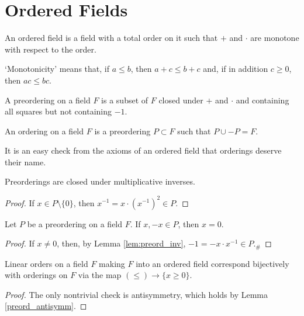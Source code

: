 \section{Ordered Fields}

\begin{definition}
  \label{def:ordered_field}
  \leanok
  An ordered field is a field with a total order on it such that $+$ and $\cdot$ are monotone with respect to the order.
\end{definition}

`Monotonicity' means that, if $a\leq b$, then $a+c\leq b+c$ and, if in addition $c\geq0$, then $ac\leq bc$.

\begin{definition}
  \label{def:preordering}
  \leanok
  A preordering on a field $F$ is a subset of $F$ closed under $+$ and $\cdot$ and containing all squares but not containing $-1$.
\end{definition}

\begin{definition}
  \label{def:ordering}
  \leanok
  An ordering on a field $F$ is a preordering $P\subset F$ such that $P\cup -P=F$.
\end{definition}

It is an easy check from the axioms of an ordered field that orderings deserve their name.

\begin{lemma}
  \label{lem:preord_inv}
  \leanok
  Preorderings are closed under multiplicative inverses.
\end{lemma}
\begin{proof}
  \leanok
  If $x\in P\setminus\{0\}$, then $x^{-1}=x\cdot(x^{-1})^2\in P$.
\end{proof}

\begin{lemma}
  \label{lem:preord_antisymm}
  \leanok
  Let $P$ be a preordering on a field $F$. If $x,-x\in P$, then $x=0$.
\end{lemma}
\begin{proof}
  \leanok
  If $x\neq0$, then, by Lemma \ref{lem:preord_inv}, $-1=-x\cdot x^{-1}\in P$.$_\#$
\end{proof}

\begin{lemma}
  \label{lem:linord_fieldord_bij}
  \leanok
  Linear orders on a field $F$ making $F$ into an ordered field correspond bijectively with orderings on $F$ via the map $(\leq)\to\{x\geq0\}$.
\end{lemma}
\begin{proof}
  \leanok
  The only nontrivial check is antisymmetry, which holds by Lemma \ref{preord_antisymm}.
\end{proof}


